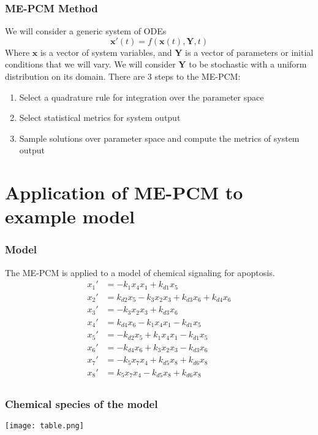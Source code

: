 \documentclass{beamer}
\theoremstyle{plain}
\theoremstyle{definition}
\begin{document}
\begin{frame}\frametitle{ME-PCM Method}
 We will consider a generic system of ODEs
 \begin{equation*}
  \mathbf{x}'(t) = f(\mathbf{x}(t),\mathbf{Y},t)
 \end{equation*}
 Where $\mathbf{x}$ is a vector of system variables, and $\mathbf{Y}$ is a vector of parameters or initial conditions that we will vary. We will consider $\mathbf{Y}$ to be stochastic with a uniform distribution on its domain. There are 3 steps to the ME-PCM:
 \begin{enumerate}
  \item Select a quadrature rule for integration over the parameter space
  \item Select statistical metrics for system output
  \item Sample solutions over parameter space and compute the metrics of system output
 \end{enumerate}
\end{frame}

\section{Application of ME-PCM to example model}

\begin{frame}\frametitle{Model}
 The ME-PCM is applied to a model of chemical signaling for apoptosis.
 \begin{align*}
  x_1' &= -k_1x_4x_1 + k_{d1}x_5\\
  x_2' &= k_{d2}x_5 - k_3x_2x_3 + k_{d3}x_6 + k_{d4}x_6\\
  x_3' &= -k_3x_2x_3 + k_{d3}x_6\\
  x_4' &= k_{d4}x_6 - k_1x_4x_1 - k_{d1}x_5\\
  x_5' &= -k_{d2}x_5 + k_1x_4x_1 - k_{d1}x_5\\
  x_6' &= -k_{d4}x_6 + k_3x_2x_3 - k_{d3}x_6\\
  x_7' &= -k_5x_7x_4 + k_{d5}x_8 + k_{d6}x_8\\
  x_8' &= k_5x_7x_4 - k_{d5}x_8 + k_{d6}x_8\\
 \end{align*}
\end{frame}

\begin{frame}\frametitle{Chemical species of the model}
 \begin{center}
  \texttt{[image: table.png]}
 \end{center}
\end{frame}
\end{document}
